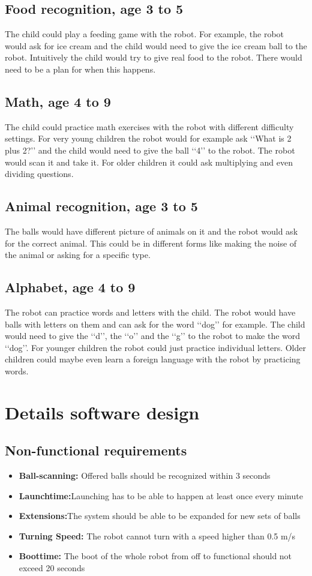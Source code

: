 \documentclass[11pt,twoside,a4paper]{report}
\begin{document}
\begin{appendices}
\section{Food recognition, age 3 to 5}
The child could play a feeding game with the robot. For example, the robot would ask for ice cream and the child would need to give the ice cream ball to the robot. Intuitively the child would try to give real food to the robot. There would need to be a plan for when this happens.
\section{Math, age 4 to 9}
The child could practice math exercises with the robot with different difficulty settings. For very young children the robot would for example ask \lq\lq{}What is 2 plus 2?\rq\rq{} and the child would need to give the ball \lq\lq{}4\rq\rq{} to the robot. The robot would scan it and take it. For older children it could ask multiplying and even dividing questions.
\section{Animal recognition, age 3 to 5}
The balls would have different picture of animals on it and the robot would ask for the correct animal. This could be in different forms like making the noise of the animal or asking for a specific type.
\section{Alphabet, age 4 to 9}
The robot can practice words and letters with the child. The robot would have balls with letters on them and can ask for the word \lq\lq{}dog\rq\rq{} for example. The child would need to give the \lq\lq{}d\rq\rq{}, the \lq\lq{}o\rq\rq{} and the \lq\lq{}g\rq\rq{} to the robot to make the word \lq\lq{}dog\rq\rq{}. For younger children the robot could just practice individual letters. Older children could maybe even learn a foreign language with the robot by practicing words.
\label{appendix:games}

\chapter{Details software design}
\section{Non-functional requirements}
\begin{itemize}
\item \textbf{Ball-scanning:} Offered balls should be recognized within 3 seconds
\item\textbf{Launchtime:}Launching has to be able to happen at least once every minute
\item\textbf{Extensions:}The system should be able to be expanded for new sets of balls
\item\textbf{Turning Speed:} The robot cannot turn with a speed higher than 0.5 m/s
\item\textbf{Boottime:} The boot of the whole robot from off to functional should not exceed 20 seconds
\end{itemize}


\end{appendices}
\end{document}
